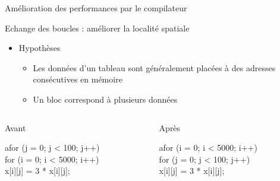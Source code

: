 %


\begin{Frame}{Amélioration des performances par le compilateur}

      \begin{block}{Echange des boucles : améliorer la localité spatiale}
       \begin{center}
 	\begin{itemize}
         \item Hypothèses
		\begin{itemize}
         		\item Les données d'un tableau sont généralement placées à des adresses consécutives en mémoire
			\item Un bloc correspond à plusieurs données
   		\end{itemize}
        \end{itemize}
       \end{center}
      \end{block}   

\vspace{-0,7cm}

  \begin{columns}[t]
    \begin{column}{5cm} %
      \begin{block}{Avant}
        \begin{lstset}
		afor (j = 0; j < 100; j++) \\
			for (i = 0; i < 5000; i++)  \\
				x[i][j] = 3 * x[i][j];
	\end{lstset}
      \end{block} 
    \end{column}
    
    \begin{column}{5cm} %
      \begin{block}{Après}
	\begin{lstset}
		afor (i = 0; i < 5000; i++) \\
			for (j = 0; j < 100; j++) \\
				x[i][j] = 3 * x[i][j];
	\end{lstset}
	\end{block}
    \end{column}
  \end{columns}  



\end{Frame}
